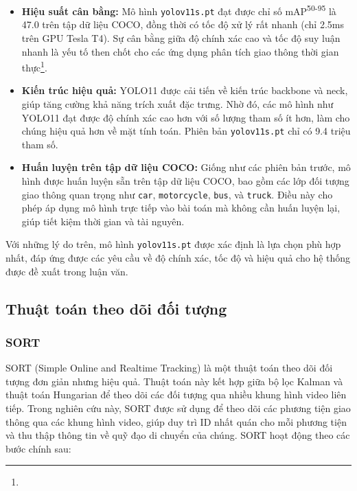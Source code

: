 \begin{itemize}
    \item \textbf{Hiệu suất cân bằng:} Mô hình \texttt{yolov11s.pt} đạt được chỉ số mAP\textsuperscript{50-95} là 47.0 trên tập dữ liệu COCO, đồng thời có tốc độ xử lý rất nhanh (chỉ 2.5ms trên GPU Tesla T4). Sự cân bằng giữa độ chính xác cao và tốc độ suy luận nhanh là yếu tố then chốt cho các ứng dụng phân tích giao thông thời gian thực\footnote[1]{}.
    \item \textbf{Kiến trúc hiệu quả:} YOLO11 được cải tiến về kiến trúc backbone và neck, giúp tăng cường khả năng trích xuất đặc trưng. Nhờ đó, các mô hình như YOLO11 đạt được độ chính xác cao hơn với số lượng tham số ít hơn, làm cho chúng hiệu quả hơn về mặt tính toán. Phiên bản \texttt{yolov11s.pt} chỉ có 9.4 triệu tham số.
    \item \textbf{Huấn luyện trên tập dữ liệu COCO:} Giống như các phiên bản trước, mô hình được huấn luyện sẵn trên tập dữ liệu COCO, bao gồm các lớp đối tượng giao thông quan trọng như \texttt{car}, \texttt{motorcycle}, \texttt{bus}, và \texttt{truck}. Điều này cho phép áp dụng mô hình trực tiếp vào bài toán mà không cần huấn luyện lại, giúp tiết kiệm thời gian và tài nguyên.
\end{itemize}
Với những lý do trên, mô hình \texttt{yolov11s.pt} được xác định là lựa chọn phù hợp nhất, đáp ứng được các yêu cầu về độ chính xác, tốc độ và hiệu quả cho hệ thống được đề xuất trong luận văn.

\subsection{Thuật toán theo dõi đối tượng}
\subsubsection{SORT}
SORT (Simple Online and Realtime Tracking) là một thuật toán theo dõi đối tượng đơn giản nhưng hiệu quả. Thuật toán này kết hợp giữa bộ lọc Kalman và thuật toán Hungarian để theo dõi các đối tượng qua nhiều khung hình video liên tiếp. Trong nghiên cứu này, SORT được sử dụng để theo dõi các phương tiện giao thông qua các khung hình video, giúp duy trì ID nhất quán cho mỗi phương tiện và thu thập thông tin về quỹ đạo di chuyển của chúng. SORT hoạt động theo các bước chính sau:

